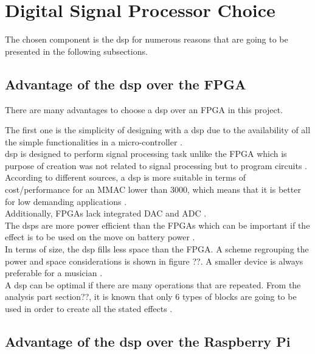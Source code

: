 \section{Digital Signal Processor Choice}

The chosen component is the \gls{dsp} for numerous reasons that are going to be presented in the following subsections.

\subsection{Advantage of the \gls{dsp} over the FPGA}

There are many advantages to choose a \gls{dsp} over an FPGA in this project. 

The first one is the simplicity of designing with a \gls{dsp} due to the availability of all the simple functionalities in a micro-controller \citep{eetimes}. \\

\gls{dsp} is designed to perform signal processing task unlike the FPGA which is purpose of creation was not related to signal processing but to program circuits \citep{eetimes}. \\

According to different sources, a \gls{dsp} is more suitable in terms of cost/performance for an MMAC lower than 3000, which means that it is better for low demanding applications \citep{eetimes}. \\

Additionally, FPGAs lack integrated DAC and ADC \citep{eetimes}. \\

The \gls{dsp}s are more power efficient than the FPGAs which can be important if the effect is to be used on the move on battery power \citep{rtcmag}. \\

In terms of size, the \gls{dsp} fills less space than the FPGA. A scheme regrouping the power and space considerations is shown in figure ??.  A smaller device is always preferable for a musician \citep{offchip}. \\

A \gls{dsp} can be optimal if there are many operations that are repeated. From the analysis part section??, it is known that only 6 types of blocks are going to be used in order to create all the stated effects \citep{eetimes} \citep{hunteng}. \\

\subsection{Advantage of the \gls{dsp} over the Raspberry Pi}

